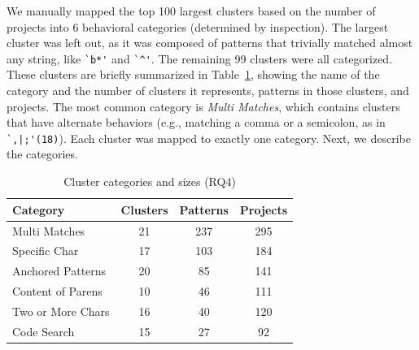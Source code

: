 We manually mapped the top 100 largest clusters based on the number of projects into 6 behavioral categories (determined by inspection).  The largest cluster was left out, as it was composed of patterns that trivially matched almost any string, like \verb!`b*'! and \verb!`^'!.  The remaining 99 clusters were all categorized. These clusters are briefly summarized in Table~\ref{tab:clustercats}, showing the name of the category and the number of clusters it represents, patterns in those clusters, and projects. The most common category is \emph{Multi Matches}, which contains clusters that have alternate behaviors (e.g., matching a comma or a semicolon, as in \verb!`,|;'(18)!). Each cluster was mapped to exactly one category. Next, we describe the categories. %


\begin{table}
\begin{center}
\begin{small}

\caption{Cluster categories and sizes (RQ4) \label{tab:clustercats}}
\begin{tabular}{lccc}
\toprule
\textbf{Category} & \textbf{Clusters} & \textbf{Patterns} & \textbf{Projects} \\  \hline \bigstrut
Multi Matches & 21 & 237 & 295\\
\hline \bigstrut
Specific Char & 17 & 103 & 184\\
\hline \bigstrut
Anchored Patterns & 20 & 85 & 141\\
\hline \bigstrut
 Content of Parens & 10 & 46 & 111\\
\hline \bigstrut
Two or More Chars & 16 & 40 & 120\\
\hline \bigstrut
Code Search & 15 & 27 & 92 \\
\bottomrule
\end{tabular}
\vspace{-12pt}
\end{small}
\end{center}
\end{table}

